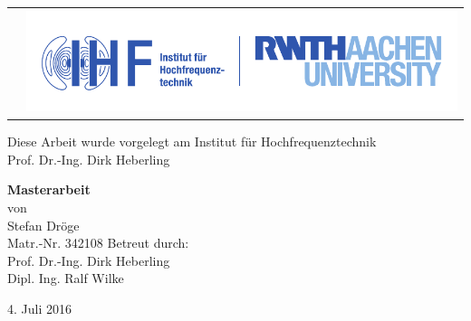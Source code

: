 
\thispagestyle{empty}
 
\makeatletter
\begin{titlepage}

\begin{tabularx}{1.1\textwidth}{Xr}
  & \includegraphics[height=3cm]{figures/rwth_ihf_de_rgb-eps-converted-to.pdf} \hspace{0.5cm}
\end{tabularx}

\begin{flushleft}
Diese Arbeit wurde vorgelegt am Institut für Hochfrequenztechnik\\
Prof. Dr.-Ing. Dirk Heberling
\end{flushleft}
\vspace{2cm}

\begin{center}

\textbf{
\LARGE Masterarbeit\\
\vspace{0,5cm}
\Huge
\@title
\vfill}
\LARGE von\\
\vspace{1cm}
\LARGE Stefan Dröge\\
Matr.-Nr. 342108
\vfill
\LARGE
\vfill
Betreut durch:\\
Prof. Dr.-Ing. Dirk Heberling\\
Dipl. Ing. Ralf Wilke
\vfill
\begin{flushright}
4. Juli 2016
\end{flushright}
 
 
\end{center}
\end{titlepage}
\makeatother

\endinput

\maketitle